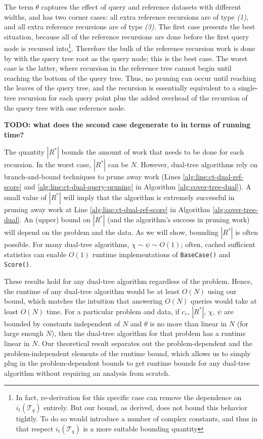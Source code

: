 The term $\theta$ captures the effect of query and reference datasets with
different widths, and has two corner cases: all extra reference recursions are of
type \textit{(1)}, and all extra reference recursions are of type \textit{(3)}.
The first case presents the best situation, because all of the reference
recursions are done before the first query node is recursed into\footnote{In
fact, re-derivation for this specific case can remove the dependence on
$i_t(\mathscr{T}_q)$ entirely.  But our bound, as derived, does not bound this
behavior tightly.  To do so would introduce a number of complex constants, and
thus in that respect $i_t(\mathscr{T}_q)$ is a more suitable bounding quantity}.
Therefore the bulk of the reference recursion work is done by with the query
tree root as the query node; this is the best case.  The worst case is the
latter, where recursion in the reference tree cannot begin until reaching the
bottom of the query tree.  Thus, no pruning can occur until reaching the leaves
of the query tree, and the recursion is essentially equivalent to a single-tree
recursion for each query point plus the added overhead of the recursion of the
query tree with one reference node.

{\bf TODO: what does the second case degenerate to in terms of running time?}

The quantity $|R^*|$ bounds the amount of work that needs to be done for each
recursion. In the worst case, $|R^*|$ can be $N$. However,
dual-tree algorithms rely on branch-and-bound techniques to prune away
work (Lines \ref{alg:line:ct-dual-ref-score} and
\ref{alg:line:ct-dual-query-pruning} in Algorithm \ref{alg:cover-tree-dual}). A
small value of $|R^*|$ will imply that the algorithm is extremely successful in
pruning away work at Line \ref{alg:line:ct-dual-ref-score} in Algorithm
\ref{alg:cover-tree-dual}. An (upper) bound on $|R^*|$ (and the algorithm's
success in pruning work) will depend on the problem and the data.  As we will
show, bounding $|R^*|$ is often possible. %
For many dual-tree algorithms, $\chi \sim \psi \sim O(1)$; often, cached
sufficient statistics \citep{moore2000anchors} can enable $O(1)$ runtime
implementations of \texttt{BaseCase()} and \texttt{Score()}.

These results hold for any dual-tree algorithm regardless of the problem. Hence,
the runtime of any dual-tree algorithm
would be at least $O(N)$ using our bound, which matches the intuition that
answering $O(N)$ queries would take at least $O(N)$ time. For a particular
problem and data, if $c_r$, $|R^*|$, $\chi$, $\psi$ are bounded by constants
independent of $N$ and $\theta$ is no more than linear in $N$ (for large enough
$N$), then the dual-tree algorithm for that problem has a runtime linear in $N$.
Our theoretical result separates out the problem-dependent and the
problem-independent elements of the runtime bound, which allows us to simply
plug in the problem-dependent bounds to get runtime bounds for any dual-tree
algorithm without requiring an analysis from scratch.

